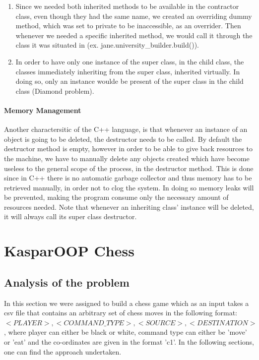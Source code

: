 \documentclass[12pt, A4]{report}
\begin{document}
				\begin{enumerate}
					\item  Since we needed both inherited methods to be available in the contractor class, even though they had the same name, we created an overriding dummy method, which was set to private to be inaccessible, as an overrider. Then whenever we needed a specific inherited method, we would call it through the class it was situated in (ex. jane.university\_builder.build()).
					\item In order to have only one instance of the super class, in the child class, the classes immediately inheriting from the super class, inherited virtually. In doing so, only an instance woulde be present of the super class in the child class (Diamond problem).
				\end{enumerate}
			
			\subsubsection*{Memory Management}
			Another charactersitic of the C++ language, is that whenever an instance of an object is going to be deleted, the destructor needs to be called. By default the destructor method is empty, however in order to be able to give back resources to the machine, we have to manually delete any objects created which have become useless to the general scope of the process, in the destructor method. This is done since in C++ there is no automatic garbage collector and thus memory has to be retrieved manually, in order not to clog the system. In doing so memory leaks will be prevented, making the program consume only the necessary amount of resources needed. Note that whenever an inheriting class' instance will be deleted, it will always call its super class destructor.

\chapter*{KasparOOP Chess}

	\section*{Analysis of the problem}
	In this section we were assigned to build a chess game which as an input takes a csv file that contains an arbitrary set of chess moves in the following format: $<PLAYER>,<COMMAND\_TYPE>,<SOURCE>,<DESTINATION>$, where player can either be black or white, command type can either be 'move' or 'eat' and the co-ordinates are given in the format 'c1'. In the following sections, one can find the approach undertaken.
\end{document}
